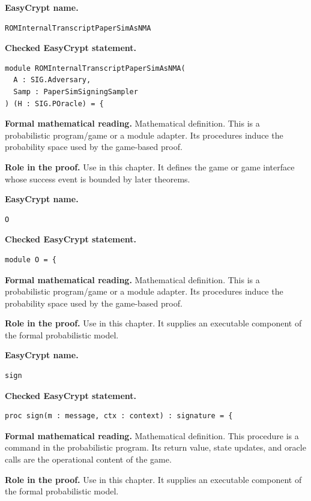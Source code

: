 \begin{formaldefinition}
\noindent\textbf{EasyCrypt name.}
\begin{lstlisting}[language=EasyCrypt,basicstyle=\ttfamily\scriptsize]
ROMInternalTranscriptPaperSimAsNMA
\end{lstlisting}
\noindent\textbf{Checked EasyCrypt statement.}
\begin{lstlisting}[language=EasyCrypt,basicstyle=\ttfamily\scriptsize]
module ROMInternalTranscriptPaperSimAsNMA(
  A : SIG.Adversary,
  Samp : PaperSimSigningSampler
) (H : SIG.POracle) = {
\end{lstlisting}
\noindent\textbf{Formal mathematical reading.}
Mathematical definition. This is a probabilistic program/game or a module adapter.  Its procedures induce the probability space used by the game-based proof.

\noindent\textbf{Role in the proof.}
Use in this chapter. It defines the game or game interface whose success event is bounded by later theorems.

\end{formaldefinition}

\begin{formaldefinition}
\noindent\textbf{EasyCrypt name.}
\begin{lstlisting}[language=EasyCrypt,basicstyle=\ttfamily\scriptsize]
O
\end{lstlisting}
\noindent\textbf{Checked EasyCrypt statement.}
\begin{lstlisting}[language=EasyCrypt,basicstyle=\ttfamily\scriptsize]
module O = {
\end{lstlisting}
\noindent\textbf{Formal mathematical reading.}
Mathematical definition. This is a probabilistic program/game or a module adapter.  Its procedures induce the probability space used by the game-based proof.

\noindent\textbf{Role in the proof.}
Use in this chapter. It supplies an executable component of the formal probabilistic model.

\end{formaldefinition}

\begin{formaldefinition}
\noindent\textbf{EasyCrypt name.}
\begin{lstlisting}[language=EasyCrypt,basicstyle=\ttfamily\scriptsize]
sign
\end{lstlisting}
\noindent\textbf{Checked EasyCrypt statement.}
\begin{lstlisting}[language=EasyCrypt,basicstyle=\ttfamily\scriptsize]
proc sign(m : message, ctx : context) : signature = {
\end{lstlisting}
\noindent\textbf{Formal mathematical reading.}
Mathematical definition. This procedure is a command in the probabilistic program.  Its return value, state updates, and oracle calls are the operational content of the game.

\noindent\textbf{Role in the proof.}
Use in this chapter. It supplies an executable component of the formal probabilistic model.

\end{formaldefinition}

